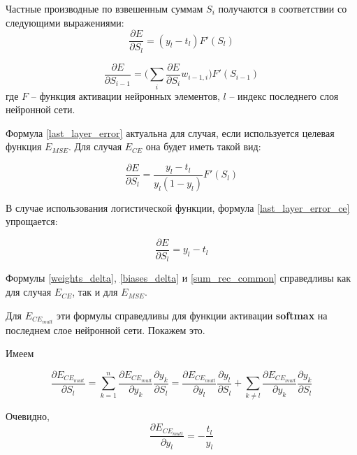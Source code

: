 Частные производные по взвешенным суммам $S_i$ получаются в соответствии со следующими выражениями:
\begin{equation}
	\label{last_layer_error}
	\frac{\partial E}{\partial S_l} = (y_l - t_l)F'(S_l)
\end{equation}

\begin{equation}
	\label{sum_rec_common}
	\frac{\partial E}{\partial S_{i-1}} = \Bigg(\sum_{i}\frac{\partial E}{\partial S_i}w_{i-1, i}\Bigg)F'(S_{i-1})
\end{equation}
где $F$ -- функция активации нейронных элементов, $l$ -- индекс последнего слоя нейронной сети.

Формула \ref{last_layer_error} актуальна для случая, если используется целевая функция $E_{MSE}$. Для случая $E_{CE}$ она будет иметь такой вид:

\begin{equation}
	\label{last_layer_error_ce}
	\frac{\partial E}{\partial S_l} = \frac{y_l - t_l}{y_l(1-y_l)}F'(S_l)
\end{equation}

В случае использования логистической функции, формула \ref{last_layer_error_ce} упрощается:

\begin{equation}
	\frac{\partial E}{\partial S_l} = y_l - t_l
\end{equation}

Формулы \ref{weights_delta}, \ref{biases_delta} и \ref{sum_rec_common} справедливы как для случая $E_{CE}$, так и для $E_{MSE}$.

Для $E_{CE_{mult}}$ эти формулы справедливы для функции активации \textbf{softmax} на последнем слое нейронной сети. Покажем это.

Имеем

\begin{equation}
	\label{common_E}
	\frac{\partial E_{CE_{mult}}}{\partial S_l} = \sum_{k=1}^{n} \frac{\partial E_{CE_{mult}}}{\partial y_k}\frac{\partial y_k}{\partial S_l} = \frac{\partial E_{CE_{mult}}}{\partial y_l}\frac{\partial y_l}{\partial S_l} + \sum_{k\neq l}\frac{\partial E_{CE_{mult}}}{\partial y_k}\frac{\partial y_k}{\partial S_l}
\end{equation}

Очевидно, 
\begin{equation}
	\label{part_deriv_y}
	\frac{\partial E_{CE_{mult}}}{\partial y_l} = -\frac{t_l}{y_l}
\end{equation}

